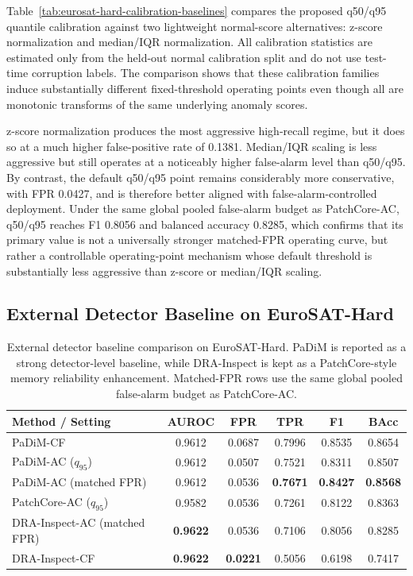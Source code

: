 \documentclass[remotesensing,article,submit,pdftex,moreauthors]{Definitions/mdpi}
\begin{document}
\noindent Table~\ref{tab:eurosat-hard-calibration-baselines} compares the proposed q50/q95 quantile calibration against two lightweight normal-score alternatives: z-score normalization and median/IQR normalization. All calibration statistics are estimated only from the held-out normal calibration split and do not use test-time corruption labels. The comparison shows that these calibration families induce substantially different fixed-threshold operating points even though all are monotonic transforms of the same underlying anomaly scores.

\noindent z-score normalization produces the most aggressive high-recall regime, but it does so at a much higher false-positive rate of 0.1381. Median/IQR scaling is less aggressive but still operates at a noticeably higher false-alarm level than q50/q95. By contrast, the default q50/q95 point remains considerably more conservative, with FPR 0.0427, and is therefore better aligned with false-alarm-controlled deployment. Under the same global pooled false-alarm budget as PatchCore-AC, q50/q95 reaches F1 0.8056 and balanced accuracy 0.8285, which confirms that its primary value is not a universally stronger matched-FPR operating curve, but rather a controllable operating-point mechanism whose default threshold is substantially less aggressive than z-score or median/IQR scaling.

\subsection{External Detector Baseline on EuroSAT-Hard}

\begin{table}[!htbp]
\caption{External detector baseline comparison on EuroSAT-Hard. PaDiM is reported as a strong detector-level baseline, while DRA-Inspect is kept as a PatchCore-style memory reliability enhancement. Matched-FPR rows use the same global pooled false-alarm budget as PatchCore-AC.}
\label{tab:eurosat-hard-external-baseline}
\centering
\small
\setlength{\tabcolsep}{4pt}
\begin{tabular}{lccccc}
\hline
Method / Setting & AUROC & FPR & TPR & F1 & BAcc \\
\hline
PaDiM-CF & 0.9612 & 0.0687 & 0.7996 & 0.8535 & 0.8654 \\
PaDiM-AC ($q_{95}$) & 0.9612 & 0.0507 & 0.7521 & 0.8311 & 0.8507 \\
PaDiM-AC (matched FPR) & 0.9612 & 0.0536 & \textbf{0.7671} & \textbf{0.8427} & \textbf{0.8568} \\
PatchCore-AC ($q_{95}$) & 0.9582 & 0.0536 & 0.7261 & 0.8122 & 0.8363 \\
DRA-Inspect-AC (matched FPR) & \textbf{0.9622} & 0.0536 & 0.7106 & 0.8056 & 0.8285 \\
DRA-Inspect-CF & \textbf{0.9622} & \textbf{0.0221} & 0.5056 & 0.6198 & 0.7417 \\
\hline
\end{tabular}
\end{table}
\end{document}
